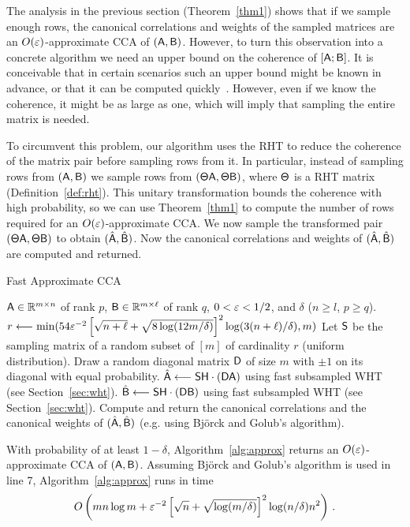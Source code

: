 The analysis in the previous section (Theorem~\ref{thm1}) shows that if we sample enough rows, the canonical correlations and weights of the sampled matrices are an $O(\varepsilon)$-approximate CCA of $({\mathsf{A} }, {\mathsf{B} })$. However, to turn this observation into a concrete algorithm we need an upper bound on the coherence of $[{\mathsf{A} } ; {\mathsf{B} }]$. It is conceivable that in certain scenarios such an upper bound might be known in advance, or that it can be computed quickly~\cite{DMMW12}. However, even if we know the coherence, it might be as large as one, which will imply that sampling the entire matrix is needed.

To circumvent this problem, our algorithm uses the RHT to reduce the coherence of the matrix pair before sampling rows from it. In particular, instead of sampling rows from $({\mathsf{A} }, {\mathsf{B} })$  we sample rows from $({\mathsf{\Theta} } {\mathsf{A} }, {\mathsf{\Theta} }{\mathsf{B} })$, where ${\mathsf{\Theta} }$ is a RHT matrix (Definition~\ref{def:rht}). This unitary transformation bounds the coherence with high probability, so we can use Theorem~\ref{thm1} to compute the number of rows required for an $O(\varepsilon)$-approximate CCA.
We now sample the transformed pair $({\mathsf{\Theta} } {\mathsf{A} }, {\mathsf{\Theta} }{\mathsf{B} })$ to obtain $(\hat{{\mathsf{A} }}, \hat{{\mathsf{B} }})$. Now the canonical correlations and weights of $(\hat{{\mathsf{A} }}, \hat{{\mathsf{B} }})$ are computed and returned.
\begin{algorithm}[t]
\caption{Fast Approximate CCA}
\label{alg:approx}
\begin{algorithmic}[1]
 ${\mathsf{A} } \in \mathbb{R}^{m \times n}$ of rank $p$, ${\mathsf{B} } \in \mathbb{R}^{m \times \ell}$ of rank $q$, $0< \varepsilon < 1/2$, and $\delta$ ($n\geq l$, $p \ge q$).
\medskip
\State $r \longleftarrow \min(54\varepsilon^{-2}\left[\sqrt{n+\ell} + \sqrt{8\log(12m/\delta)} \right]^2 \log (3(n+\ell)/\delta), m)$
\State Let ${\mathsf{S} }$ be the sampling matrix of a random subset of $[m]$ of cardinality $r$ (uniform distribution).
\State Draw a random diagonal matrix ${\mathsf{D} }$ of size $m$ with $\pm 1$ on its diagonal with equal probability.
\State $\hat{{\mathsf{A} }} \longleftarrow {\ensuremath{\mathsf{S} }} {\ensuremath{\mathsf{H} }} \cdot ({\mathsf{D} } {\mathsf{A} })$ using fast subsampled WHT (see Section~\ref{sec:wht}).
\State $\hat{{\mathsf{B} }} \longleftarrow {\ensuremath{\mathsf{S} }} {\ensuremath{\mathsf{H} }} \cdot ({\mathsf{D} } {\mathsf{B} })$ using fast subsampled WHT (see Section~\ref{sec:wht}).
\State Compute and return the canonical correlations and the canonical weights of $( \hat{{\mathsf{A} }},\hat{{\mathsf{B} }} )$
(e.g. using Bj{\"o}rck and Golub's algorithm).
\end{algorithmic}
\end{algorithm}

\begin{theorem}\label{thm:alg}
With probability of at least $1-\delta$, Algorithm~\ref{alg:approx} returns an $O(\varepsilon)$-approximate CCA of $({\mathsf{A} }, {\mathsf{B} })$. Assuming Bj{\"o}rck and Golub's algorithm is used in line 7, Algorithm~\ref{alg:approx} runs in time
$$O\left(  m n \log{m} +  \varepsilon^{-2}\left[\sqrt{n} + \sqrt{\log(m/\delta)}\right]^2 \log(n/\delta) n^2\right)\,.$$
\end{theorem}

